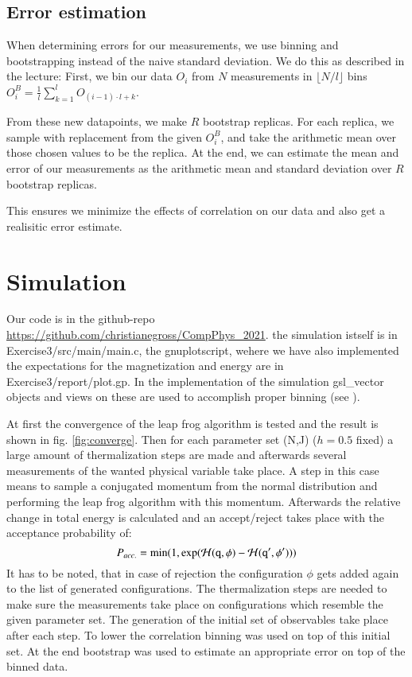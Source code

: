 \documentclass{scrartcl}
\begin{document}
\subsection{Error estimation}
When determining errors for our measurements, we use binning and bootstrapping instead of the naive standard deviation. 
We do this as described in the lecture: First, we bin our data $O_i$ from $N$ measurements in $\lfloor N/l\rfloor$ bins $O^B_i=\frac{1}{l}\sum_{k=1}^l O_{(i-1)\cdot l+k}$. 

From these new datapoints, we make $R$ bootstrap replicas. For each replica, we sample with replacement from the given $O_i^B$, and take the arithmetic mean over those chosen values to be the replica. At the end, we can estimate the mean and error of our measurements as the arithmetic mean and standard deviation over $R$ bootstrap replicas.

This ensures we minimize the effects of correlation on our data and also get a realisitic error estimate.

\section{Simulation}
Our code is in the github-repo \url{https://github.com/christianegross/CompPhys\_2021}. the simulation istself is in Exercise3/src/main/main.c, the gnuplotscript, wehere we have also implemented the expectations for the magnetization and energy are in Exercise3/report/plot.gp.
In the implementation of the simulation gsl\_vector objects  and views on these are used to accomplish proper binning (see \cite{gsldoc_mat}). 

At first the convergence of the leap frog algorithm is tested and the result is shown in fig. \ref{fig:converge}. Then for each parameter set (N,J) ($h=0.5$ fixed) a large amount of thermalization steps are made and afterwards several measurements of the wanted physical variable take place. A step in this case means to sample a conjugated momentum from the normal distribution and performing the leap frog algorithm with this momentum. Afterwards the relative change in total energy is calculated and an accept/reject takes place with the acceptance probability of:
\begin{equation}
	P_{acc.}=\min(1,\exp(\cal{H} (\texttt{q},\phi)-\cal H (\texttt{q}',\phi')))
\end{equation} 
It has to be noted, that in case of rejection the configuration $\phi$ gets added again to the list of generated configurations.
The thermalization steps are needed to make sure the measurements take place on configurations which resemble the given parameter set. The generation of the initial set of observables take place after each step. To lower the correlation binning was used on top of this initial set. At the end bootstrap was used to estimate an appropriate error on top of the binned data.
\end{document}
